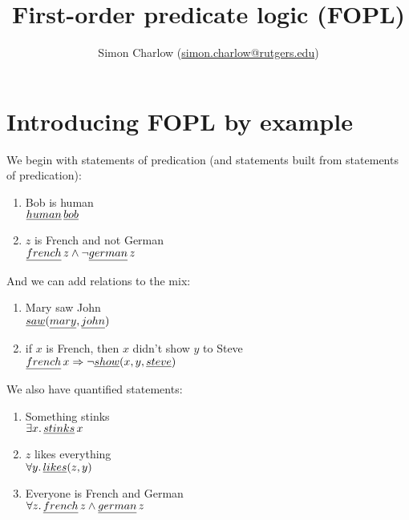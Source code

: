 \documentclass{article}
\author{Simon Charlow
(\href{mailto:simon.charlow@rutgers.edu}{{simon.charlow@rutgers.edu}})}
\title{\textbf{First-order predicate logic (FOPL)}}
\newcommand{\Ra}{\Rightarrow}
\begin{document}
\maketitle

\section{Introducing FOPL by example}

We begin with statements of predication (and statements built from statements of
predication):
\begin{enumerate}
  \item
    Bob is human
    \\
    $\emph{human}\,\emph{bob}$

  \item
    $z$ is French and not German
    \\
    $\emph{french}\,z \wedge \neg\emph{german}\,z$
\end{enumerate}

And we can add relations to the mix:
\begin{enumerate}
  \item
    Mary saw John
    \\
    $\emph{saw}(\emph{mary}, \emph{john})$

  \item
    if $x$ is French, then $x$ didn't show $y$ to Steve
    \\
    $\emph{french}\,x \Ra \neg\emph{show}(x, y, \emph{steve})$
\end{enumerate}

We also have quantified statements:
\begin{enumerate}
  \item
    Something stinks
    \\
    $\exists x.\,\emph{stinks}\,x$

  \item
    $z$ likes everything
    \\
    $\forall y.\, \emph{likes}(z, y)$

  \item
    Everyone is French and German
    \\
    $\forall z.\,\emph{french}\,z \wedge \emph{german}\,z$
\end{enumerate}
\end{document}
